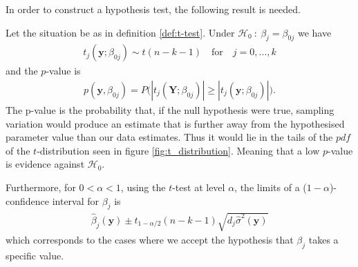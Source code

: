 In order to construct a hypothesis test, the following result is needed.

\begin{theorem}  \label{th:t_distribution}
Let the situation be as in definition \ref{def:t-test}. Under $\mathcal{H}_0 \ : \ \beta_j=\beta_{0j}$ we have 
\begin{align}
   t_j(\textbf{y};\beta_{0j})  \sim t(n-k-1) \quad \text{for} \quad j=0,\ldots,k
\end{align}
and the $p$-value is
\begin{align}\label{eq:t_test_pvalue}
    p(\textbf{y},\beta_{0j})=P\Big(|t_j(\textbf{Y};\beta_{0j})|\geq |t_j(\textbf{y};\beta_{0j})|\Big).
\end{align}
The p-value is the probability that, if the null hypothesis were true, sampling variation would produce an estimate that is further away from the hypothesised parameter value than our data estimates.  
Thus it would lie in the tails of the $pdf$ of the $t$-distribution seen in figure \ref{fig:t_distribution}.
Meaning that a low $p$-value is evidence against $\mathcal{H}_0$.

Furthermore, for $0<\alpha<1$, using the $t$-test at level $\alpha$, the limits of a ($1-\alpha$)-confidence interval for $\beta_j$ is
\begin{align} \label{eq:t_statistic}
    \hat{\beta}_{j}(\textbf{y}) \pm t_{1-\alpha/2}(n-k-1)\sqrt{d_j\hat{\sigma}^2(\textbf{y})}
\end{align}
which corresponds to the cases where we accept the hypothesis that $\beta_j$ takes a specific value.
\end{theorem}
